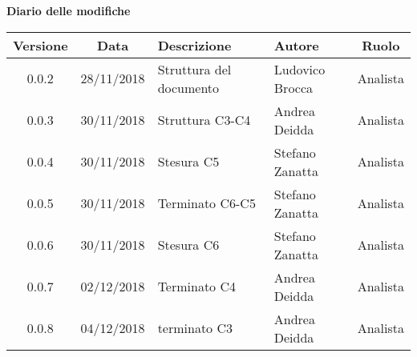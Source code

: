 \begin{center}
		\textbf{Diario delle modifiche}
	\end{center}
	\begin{center}
		\begin{tabularx}{\textwidth}{|c|c|X|X|c|}
			\hline
			\textbf{Versione} & \textbf{Data} & \textbf{Descrizione} & \textbf{Autore} & \textbf{Ruolo} \\
			\hline 
			0.0.2 & 28/11/2018 & Struttura del documento & Ludovico Brocca & Analista\\
			\hline
			0.0.3 & 30/11/2018 & Struttura C3-C4 & Andrea Deidda & Analista \\
			\hline
			0.0.4 & 30/11/2018 & Stesura C5 & Stefano Zanatta & Analista \\
			\hline
			0.0.5 & 30/11/2018 & Terminato C6-C5 & Stefano Zanatta & Analista \\
			\hline
			0.0.6 & 30/11/2018 & Stesura C6 & Stefano Zanatta & Analista \\
			\hline
			0.0.7 & 02/12/2018 & Terminato C4 & Andrea Deidda & Analista \\
			\hline
			0.0.8 & 04/12/2018 & terminato C3 & Andrea Deidda & Analista \\
			\hline
		\end{tabularx}
	\end{center}
\newpage